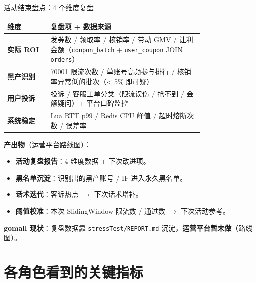 \documentclass[aspectratio=169,11pt]{beamer}
\begin{document}
\begin{frame}[shrink]{活动结束盘点：4 个维度复盘}
\scriptsize
\begin{tabular}{@{}lp{0.78\linewidth}@{}}
\toprule
维度 & 复盘项 + 数据来源 \\
\midrule
\textbf{实际 ROI}    & 发券数 / 领取率 / 核销率 / 带动 GMV / 让利金额（\texttt{coupon\_batch} + \texttt{user\_coupon} JOIN \texttt{orders}）\\
\textbf{黑产识别}    & 70001 限流次数 / 单账号高频参与排行 / 核销率异常低的批次（< 5\% 即可疑） \\
\textbf{用户投诉}    & 投诉 / 客服工单分类（限流误伤 / 抢不到 / 金额疑问）+ 平台口碑监控\\
\textbf{系统稳定}    & Lua RTT p99 / Redis CPU 峰值 / 超时熔断次数 / 误差率\\
\bottomrule
\end{tabular}
\vspace{2mm}

\textbf{产出物}（运营平台路线图）：
\begin{itemize}\itemsep0pt
  \item \textbf{活动复盘报告}：4 维度数据 + 下次改进项。
  \item \textbf{黑名单沉淀}：识别出的黑产账号 / IP 进入永久黑名单。
  \item \textbf{话术迭代}：客诉热点 $\to$ 下次话术增补。
  \item \textbf{阈值校准}：本次 SlidingWindow 限流数 / 通过数 $\to$ 下次活动参考。
\end{itemize}
\textbf{gomall 现状}：复盘数据靠 \texttt{stressTest/REPORT.md} 沉淀，\textbf{运营平台暂未做}（路线图）。
\end{frame}

\section{各角色看到的关键指标}
\end{document}

